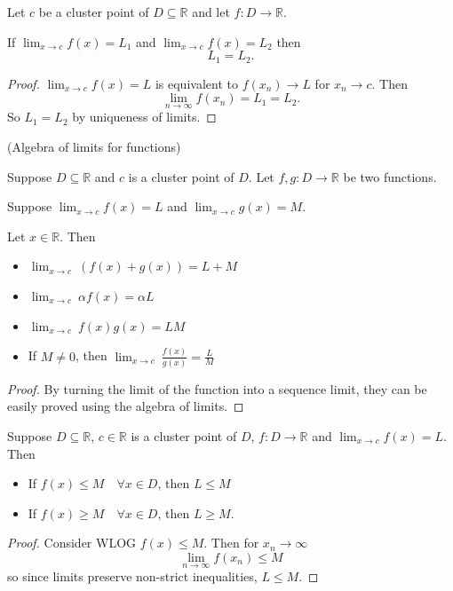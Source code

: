 \begin{prop}
    Let $c$ be a cluster point of $D \subseteq \mathbb{R}$ and let $f : D \rightarrow \mathbb{R}$.

    If $\lim_{x \rightarrow c} f(x) = L_1$ and $\lim_{x \rightarrow c} f(x) = L_2$ then
    \[L_1 = L_2.\]
\end{prop}
\begin{proof}
   $\lim_{x \rightarrow c} f(x) = L$ is equivalent to $f(x_n) \rightarrow L$ for $x_n \rightarrow c$. Then
   \[\lim_{n \rightarrow \infty} f(x_n) = L_1 = L_2.\]
   So $L_1 = L_2$ by uniqueness of limits.
\end{proof}

\begin{theorem} (Algebra of limits for functions)

  Suppose $D \subseteq \mathbb{R}$ and $c$ is a cluster point of $D.$ Let $f , g: D \rightarrow \mathbb{R}$ be two functions.

  Suppose $\lim_{x \rightarrow c} f(x) = L$ and $\lim_{x \rightarrow c} g(x) = M.$

  Let $x \in \mathbb{R}$. Then
  \begin{itemize}
    \item $\lim_{x \rightarrow c}  \ \left(f(x) + g(x)\right) = L + M$
    \item $\lim_{x \rightarrow c} \ \alpha f(x) = \alpha L$
    \item $\lim_{x \rightarrow c} \ f(x) g(x) = LM$
    \item If $M \not = 0$, then $\lim_{x \rightarrow c} \ \frac{f(x)}{g(x)} = \frac{L}{M}$
  \end{itemize}
\end{theorem}
\begin{proof}
    By turning the limit of the function into a sequence limit, they can be easily proved using the algebra of limits.
\end{proof}

\begin{theorem}
  Suppose $D \subseteq \mathbb{R}$, $c \in \mathbb{R}$ is a cluster point of $D$, $f : D \rightarrow \mathbb{R}$ and $\lim_{x \rightarrow c} f(x) = L$. Then
  \begin{itemize}
    \item If $f(x) \leq M \quad \forall x \in D$, then $L \leq M$
    \item If $f(x) \geq M \quad \forall x \in D$, then $L \geq M$.
  \end{itemize}
\end{theorem}
\begin{proof}
    Consider WLOG $f(x) \leq M$. Then for $x_n \rightarrow \infty$
    \[\lim_{n \rightarrow \infty} f(x_n) \leq M\]
    so since limits preserve non-strict inequalities, $L \leq M$.
\end{proof}

